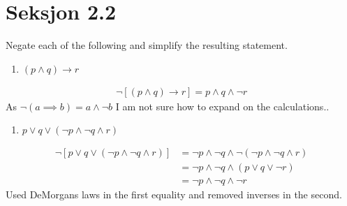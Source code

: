 \section*{Seksjon 2.2}

\begin{problem}[6]
  Negate each of the following and simplify the resulting statement.
  \begin{enumerate}
  \addtocounter{enumii}{1}
    \item $(p \wedge q) \to r$
  \end{enumerate}
  \begin{align*}
    \neg [(p \wedge q) \to r]
      = p \wedge q \wedge \neg r 
  \end{align*}
  As $\neg(a \implies b) = a \wedge \neg b$ I am not sure how to expand on the calculations..
  \begin{enumerate}[resume]
  \addtocounter{enumii}{1}
    \item $p \vee q \vee (\neg p \wedge \neg q \wedge r)$
  \end{enumerate}
  \begin{align*}
        \neg \left[ p \vee q \vee (\neg p \wedge \neg q \wedge r)\right] 
    & = \neg p \wedge \neg q \wedge \neg (\neg p \wedge \neg q \wedge r) \\
    & = \neg p \wedge \neg q \wedge (p \vee q \vee \neg r)  \\
    & = \neg p \wedge \neg q \wedge \neg r
  \end{align*}
Used DeMorgans laws in the first equality and removed inverses in the second.
\end{problem}
%
%
